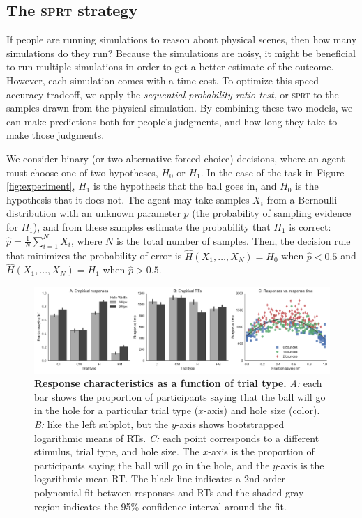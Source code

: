 \documentclass[10pt,letterpaper]{article}
\begin{document}
\subsection{The \textsc{sprt} strategy}

If people are running simulations to reason about physical scenes, then how many simulations do they run?
Because the simulations are noisy, it might be beneficial to run multiple simulations in order to get a better estimate of the outcome.
However, each simulation comes with a time cost.
To optimize this speed-accuracy tradeoff, we apply the \emph{sequential probability ratio test}, or \textsc{sprt} \cite{wald1947sequential} to the samples drawn from the physical simulation.
By combining these two models, we can make predictions both for people's judgments, and how long they take to make those judgments.

We consider binary (or two-alternative forced choice) decisions, where an agent must choose one of two hypotheses, $H_0$ or $H_1$.
In the case of the task in Figure \ref{fig:experiment}, $H_1$ is the hypothesis that the ball goes in, and $H_0$ is the hypothesis that it does not. 
The agent may take samples $X_i$ from a Bernoulli distribution with an unknown parameter $p$ (the probability of sampling evidence for $H_1$), and from these samples estimate the probability that $H_1$ is correct: $\hat{p}=\frac{1}{N}\sum_{i=1}^N X_i$, where $N$ is the total number of samples. 
Then, the decision rule that minimizes the probability of error is $\hat{H}(X_1,\ldots{},X_N)=H_0$ when $\hat{p}<0.5$ and $\hat{H}(X_1,\ldots{},X_N)=H_1$ when $\hat{p}>0.5$.

\begin{figure}[t]
    \begin{center}
        \includegraphics[width=\textwidth]{figures/hole_empirical_results.pdf}
        \caption{\textbf{Response characteristics as a function of trial type.}
        \emph{A:} each bar shows the proportion of participants saying that the ball will go in the hole for a particular trial type ($x$-axis) and hole size (color).
        \emph{B:} like the left subplot, but the $y$-axis shows bootstrapped logarithmic means of RTs. 
        \emph{C:} each point corresponds to a different stimulus, trial type, and hole size.  
        The $x$-axis is the proportion of participants saying the ball will go in the hole, and the $y$-axis is the logarithmic mean RT. 
        The black line indicates a 2nd-order polynomial fit between responses and RTs and the shaded gray region indicates the 95\% confidence interval around the fit.}
        \label{fig:pct-vs-rt}
    \end{center}
\end{figure}
\end{document}
